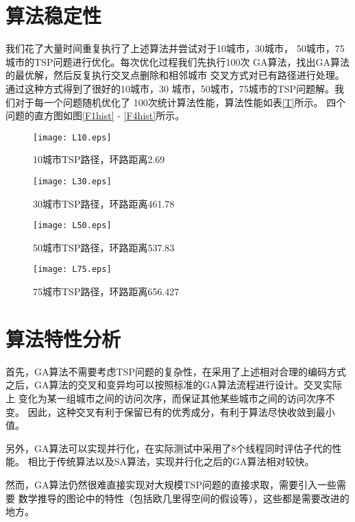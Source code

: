 \documentclass[UTF8,a4paper]{paper}
\begin{document}
\section{算法稳定性}
我们花了大量时间重复执行了上述算法并尝试对于10城市，30城市，
50城市，75城市的TSP问题进行优化。每次优化过程我们先执行100次
GA算法，找出GA算法的最优解，然后反复执行交叉点删除和相邻城市
交叉方式对已有路径进行处理。通过这种方式得到了很好的10城市，30
城市，50城市，75城市的TSP问题解。我们对于每一个问题随机优化了
100次统计算法性能，算法性能如表\ref{T}所示。
四个问题的直方图如图\ref{F1hist} - \ref{F4hist}所示。

\begin{multicols}{2}
\begin{figure}[H]\texttt{[image: L10.eps]}
\caption{10城市TSP路径，环路距离2.69}\label{F1}\end{figure}
\begin{figure}[H]\texttt{[image: L30.eps]}
\caption{30城市TSP路径，环路距离461.78}\label{F2}\end{figure}
\begin{figure}[H]\texttt{[image: L50.eps]}
\caption{50城市TSP路径，环路距离537.83}\label{F3}\end{figure}
\begin{figure}[H]\texttt{[image: L75.eps]}
\caption{75城市TSP路径，环路距离656.427}\label{F4}\end{figure}
\end{multicols}


\section{算法特性分析}
首先，GA算法不需要考虑TSP问题的复杂性，在采用了上述相对合理的编码方式
之后，GA算法的交叉和变异均可以按照标准的GA算法流程进行设计。交叉实际上
变化为某一组城市之间的访问次序，而保证其他某些城市之间的访问次序不变。
因此，这种交叉有利于保留已有的优秀成分，有利于算法尽快收敛到最小值。

另外，GA算法可以实现并行化，在实际测试中采用了8个线程同时评估子代的性能。
相比于传统算法以及SA算法，实现并行化之后的GA算法相对较快。

然而，GA算法仍然很难直接实现对大规模TSP问题的直接求取，需要引入一些需要
数学推导的图论中的特性（包括欧几里得空间的假设等），这些都是需要改进的地方。
\end{document}
